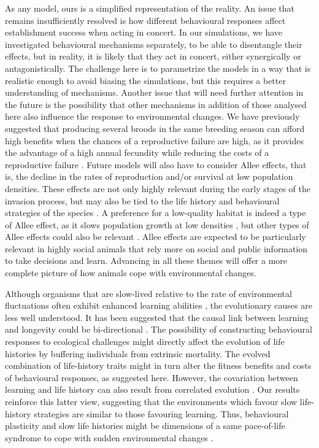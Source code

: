As any model, ours is a simplified representation of the reality.
An issue that remains insufficiently resolved is how different
behavioural responses affect establishment success when acting
in concert. In our simulations, we have investigated behavioural
mechanisms separately, to be able to disentangle their effects, but
in reality, it is likely that they act in concert, either synergically or
antagonistically. The challenge here is to parametrize the models
in a way that is realistic enough to avoid biasing the simulations,
but this requires a better understanding of mechanisms. Another
issue that will need further attention in the future is the possibility
that other mechanisms in addition of those analysed here
also influence the response to environmental changes. We have
previously suggested that producing several broods in the
same breeding season can afford high benefits when the chances
of a reproductive failure are high, as it provides the advantage of
a high annual fecundity while reducing the costs of a reproductive
failure \citep{Sol2012a}. Future models will also have to consider Allee
effects, that is, the decline in the rates of reproduction and/or survival
at low population densities. These effects are not only
highly relevant during the early stages of the invasion process,
but may also be tied to the life history and behavioural strategies
of the species \citep{Leung2004}. A preference for a low-quality habitat is
indeed a type of Allee effect, as it slows population growth at
low densities \citep{Kokko2001}, but other types of Allee effects could also be relevant
\citep{Reznick2002}. Allee effects are expected to be particularly relevant in
highly social animals that rely more on social and public information
to take decisions and learn. Advancing in all these
themes will offer a more complete picture of how animals cope
with environmental changes.

Although organisms that are slow-lived relative to the rate
of environmental fluctuations often exhibit enhanced learning
abilities \citep{Sol2016a}, the evolutionary causes are less well understood.
It has been suggested that the causal link between learning and
longevity could be bi-directional \citep{Eliassen2007, Ratikainen2019, Sol2009a}. The possibility of
constructing behavioural responses to ecological challenges
might directly affect the evolution of life histories by buffering
individuals from extrinsic mortality. The evolved combination
of life-history traits might in turn alter the fitness benefits and
costs of behavioural responses, as suggested here. However,
the covariation between learning and life history can also
result from correlated evolution \citep{Sol2016a}. Our results reinforce
this latter view, suggesting that the environments which
favour slow life-history strategies are similar to those favouring
learning. Thus, behavioural plasticity and slow life histories
might be dimensions of a same pace-of-life syndrome to cope
with sudden environmental changes \citep{Sol2016a}.

